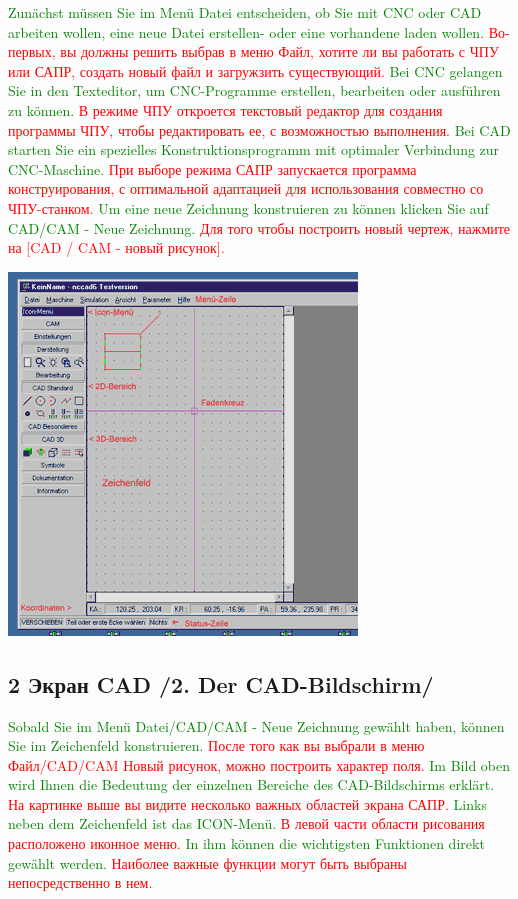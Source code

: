 \documentclass[12pt,a4paper]{book}
\newcommand{\keys}[1]{[#1]}
\newcommand{\DE}[1]{\textcolor{green}{#1}}
\newcommand{\RU}[1]{\textcolor{red}{#1}}
\newcommand{\TRsubsection}[2]{\subsection{#2 /#1/}}
\begin{document}
\DE{Zunächst müssen Sie im Menü Datei entscheiden, ob Sie mit CNC oder CAD arbeiten 
wollen, eine neue Datei erstellen- oder eine vorhandene laden wollen.}
\RU{Во-первых, вы должны решить выбрав в меню Файл, хотите ли вы работать с ЧПУ
или САПР, создать новый файл и загружзить существующий.}
\DE{Bei CNC 
gelangen Sie in den Texteditor, um CNC-Programme erstellen, bearbeiten oder 
ausführen zu können.}
\RU{В режиме ЧПУ откроется текстовый редактор для создания программы ЧПУ, чтобы
редактировать ее, с возможностью выполнения.}
\DE{Bei CAD starten Sie ein spezielles Konstruktionsprogramm 
mit optimaler Verbindung zur CNC-Maschine.}
\RU{При выборе режима САПР запускается программа конструирования, с оптимальной
адаптацией для использования совместно со ЧПУ-станком.} 
\DE{Um eine neue Zeichnung konstruieren zu können klicken Sie auf CAD/CAM - Neue 
Zeichnung.}
\RU{Для того чтобы построить новый чертеж, нажмите на \keys{CAD / CAM - новый
рисунок}.}

\includegraphics{pic/Kons2.png}
\TRsubsection{2. Der CAD-Bildschirm}{2 Экран CAD}

\DE{Sobald Sie im Menü Datei/CAD/CAM - Neue Zeichnung gewählt haben, können Sie
im Zeichenfeld konstruieren.}
\RU{После того как вы выбрали в меню Файл/CAD/CAM Новый рисунок, можно построить
характер поля.}
\DE{Im Bild oben wird Ihnen die Bedeutung der
einzelnen Bereiche des CAD-Bildschirms erklärt.}
\RU{На картинке выше вы видите несколько важных областей экрана САПР.}
\DE{Links neben dem Zeichenfeld ist
das ICON-Menü.}
\RU{В левой части области рисования расположено иконное меню.}
\DE{In ihm können die wichtigsten Funktionen direkt gewählt werden.}
\RU{Наиболее важные функции могут быть выбраны непосредственно в нем.} 
\end{document}
